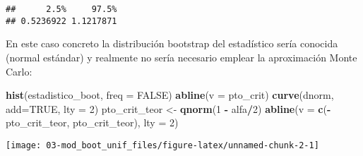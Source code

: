 \documentclass[]{book}
\newenvironment{Shaded}{\begin{snugshade}}{\end{snugshade}}
\newcommand{\KeywordTok}[1]{\textcolor[rgb]{0.13,0.29,0.53}{\textbf{#1}}}
\newcommand{\DataTypeTok}[1]{\textcolor[rgb]{0.13,0.29,0.53}{#1}}
\newcommand{\DecValTok}[1]{\textcolor[rgb]{0.00,0.00,0.81}{#1}}
\newcommand{\StringTok}[1]{\textcolor[rgb]{0.31,0.60,0.02}{#1}}
\newcommand{\CommentTok}[1]{\textcolor[rgb]{0.56,0.35,0.01}{\textit{#1}}}
\newcommand{\OtherTok}[1]{\textcolor[rgb]{0.56,0.35,0.01}{#1}}
\newcommand{\OperatorTok}[1]{\textcolor[rgb]{0.81,0.36,0.00}{\textbf{#1}}}
\newcommand{\NormalTok}[1]{#1}
\theoremstyle{break}
\theoremstyle{definition}
\theoremstyle{definition}
\theoremstyle{definition}
\theoremstyle{remark}
\begin{document}
\begin{Shaded}
\end{Shaded}

\begin{verbatim}
##      2.5%     97.5% 
## 0.5236922 1.1217871
\end{verbatim}

En este caso concreto la distribución bootstrap del estadístico sería
conocida (normal estándar) y realmente no sería necesario emplear la
aproximación Monte Carlo:

\begin{Shaded}
\begin{Highlighting}[]
\KeywordTok{hist}\NormalTok{(estadistico_boot, }\DataTypeTok{freq =} \OtherTok{FALSE}\NormalTok{)}
\KeywordTok{abline}\NormalTok{(}\DataTypeTok{v =}\NormalTok{ pto_crit)}
\KeywordTok{curve}\NormalTok{(dnorm, }\DataTypeTok{add=}\OtherTok{TRUE}\NormalTok{, }\DataTypeTok{lty =} \DecValTok{2}\NormalTok{)}
\NormalTok{pto_crit_teor <-}\StringTok{ }\KeywordTok{qnorm}\NormalTok{(}\DecValTok{1} \OperatorTok{-}\StringTok{ }\NormalTok{alfa}\OperatorTok{/}\DecValTok{2}\NormalTok{)}
\KeywordTok{abline}\NormalTok{(}\DataTypeTok{v =} \KeywordTok{c}\NormalTok{(}\OperatorTok{-}\NormalTok{pto_crit_teor, pto_crit_teor), }\DataTypeTok{lty =} \DecValTok{2}\NormalTok{)}
\end{Highlighting}
\end{Shaded}

\begin{center}\texttt{[image: 03-mod\_boot\_unif\_files/figure-latex/unnamed-chunk-2-1]} \end{center}
\end{document}

